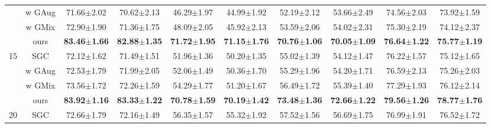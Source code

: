 \begin{table*}[ht]
{\begin{tabular}{@{}c|c|cccccccc@{}}
                      & w GAug                 & 71.66$\pm$2.02                   & 70.62$\pm$2.13                  & 46.29$\pm$1.97                   & 44.99$\pm$1.92                  & 52.19$\pm$2.12                  & 53.66$\pm$2.49                  & 74.56$\pm$2.03                  & 73.92$\pm$1.59                  \\
                      & w GMix                 & 72.90$\pm$1.90                   & 71.36$\pm$1.75                  & 48.09$\pm$2.05                   & 45.92$\pm$2.13                  & 53.59$\pm$2.06                  & 54.02$\pm$2.31                  & 75.30$\pm$2.19                  & 74.12$\pm$2.37                  \\
                      & ours                   & \textbf{83.46$\pm$1.66}          & \textbf{82.88$\pm$1.35}         & \textbf{71.72$\pm$1.95}          & \textbf{71.15$\pm$1.76}         & \textbf{70.76$\pm$1.06}         & \textbf{70.05$\pm$1.09}         & \textbf{76.64$\pm$1.22}         & \textbf{75.77$\pm$1.19}         \\ \midrule
\multirow{4}{*}{15}   & SGC                    & 72.12$\pm$1.62                   & 71.49$\pm$1.51                  & 51.96$\pm$1.36                   & 50.20$\pm$1.35                  & 55.02$\pm$1.39                  & 54.12$\pm$1.47                  & 76.22$\pm$1.57                  & 75.12$\pm$1.65                  \\
                      & w GAug                 & 72.53$\pm$1.79                   & 71.99$\pm$2.05                  & 52.06$\pm$1.49                   & 50.36$\pm$1.70                  & 55.29$\pm$1.96                  & 54.20$\pm$1.71                  & 76.59$\pm$2.13                  & 75.26$\pm$2.03                  \\
                      & w GMix                 & 73.56$\pm$1.72                   & 72.26$\pm$1.59                  & 54.29$\pm$1.77                   & 51.20$\pm$1.67                  & 56.49$\pm$1.72                  & 55.39$\pm$1.40                  & 77.29$\pm$1.93                  & 76.12$\pm$2.14                  \\
                      & ours                   & \textbf{83.92$\pm$1.16}          & \textbf{83.33$\pm$1.22}         & \textbf{70.78$\pm$1.59}          & \textbf{70.19$\pm$1.42}         & \textbf{73.48$\pm$1.36}         & \textbf{72.66$\pm$1.22}         & \textbf{79.56$\pm$1.26}         & \textbf{78.77$\pm$1.76}         \\ \midrule
\multirow{4}{*}{20}   & SGC                    & 72.66$\pm$1.79                   & 72.16$\pm$1.49                  & 56.35$\pm$1.57                   & 55.32$\pm$1.92                  & 57.52$\pm$1.56                  & 56.69$\pm$1.75                  & 76.99$\pm$1.91                  & 76.52$\pm$1.72                  \\

\end{tabular}}
\end{table*}
